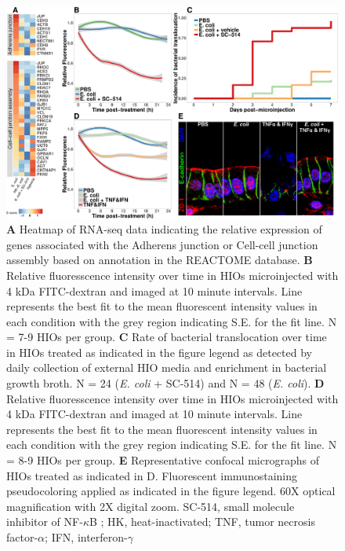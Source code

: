 \documentclass[9pt,lineo]{elife}
\begin{document}
\begin{figure}
\begin{fullwidth}
\centering
\includegraphics[width=0.95\linewidth]{./figures/figure7/figure7_multipanel.pdf}
\caption{\textbf{A} Heatmap of RNA-seq data indicating the relative expression of genes associated with the Adherens junction or Cell-cell junction assembly based on annotation in the REACTOME database. \textbf{B} Relative fluoresscence intensity over time in HIOs microinjected with 4 kDa FITC-dextran and imaged at 10 minute intervals. Line represents the best fit to the mean fluorescent intensity values in each condition with the grey region indicating S.E. for the fit line. N = 7-9 HIOs per group. \textbf{C} Rate of bacterial translocation over time in HIOs treated as indicated in the figure legend as detected by daily collection of external HIO media and enrichment in bacterial growth broth. N = 24 (\textit{E. coli} + SC-514) and N = 48 (\textit{E. coli}). \textbf{D} Relative fluoresscence intensity over time in HIOs microinjected with 4 kDa FITC-dextran and imaged at 10 minute intervals. Line represents the best fit to the mean fluorescent intensity values in each condition with the grey region indicating S.E. for the fit line. N = 8-9 HIOs per group. \textbf{E} Representative confocal micrographs of HIOs treated as indicated in D. Fluorescent immunostaining pseudocoloring applied as indicated in the figure legend. 60X optical magnification with 2X digital zoom. SC-514, small molecule inhibitor of NF-$\kappa$B ; HK, heat-inactivated; TNF, tumor necrosis factor-$\alpha$; IFN, interferon-$\gamma$}
\label{fig:fullwidth}
\end{fullwidth}
\end{figure}
\end{document}
